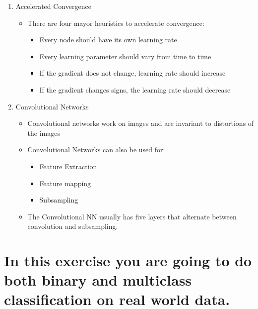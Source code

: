 \documentclass{scrartcl}
\begin{document}
\begin{enumerate}
\item Accelerated Convergence
	\begin{itemize}
	\item There are four mayor heuristics to accelerate convergence:
		\begin{itemize}
		\item Every node should have its own learning rate
		\item Every learning parameter should vary from time to time
		\item If the gradient does not change, learning rate should increase
		\item If the gradient changes signs, the learning rate should decrease
		\end{itemize} 
	\end{itemize}
\item Convolutional Networks
	\begin{itemize}
	\item Convolutional networks work on images and are invariant to distortions of the images
	\item Convolutional Networks can also be used for:
		\begin{itemize}
		\item Feature Extraction
		\item Feature mapping
		\item Subsampling
		\end{itemize}
	\item The Convolutional NN usually has five layers that alternate between convolution and subsampling.
	\end{itemize}
\end{enumerate}

\section{In this exercise you are going to do both binary and multiclass classification on real
world data.
}








%



\end{document}

